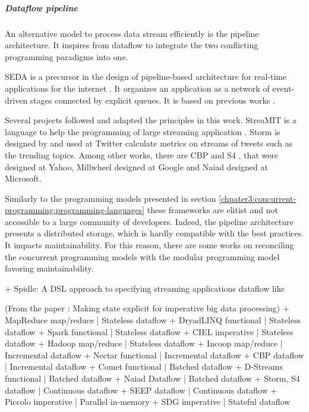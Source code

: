 \subparagraph{Dataflow pipeline} \label{chapter3:software-efficiency:dataflow-pipeline}

An alternative model to process data stream efficiently is the pipeline architecture.
It inspires from dataflow to integrate the two conflicting programming paradigms into one.

SEDA is a precursor in the design of pipeline-based architecture for real-time applications for the internet \cite{Welsh2001}.
It organizes an application as a network of event-driven stages connected by explicit queues.
It is based on previous works \cite{Gribble2001,Pai1999}.

Several projects followed and adapted the principles in this work.
StreaMIT is a language to help the programming of large streaming application \cite{Thies2002}.
Storm \cite{Toshniwal2014} is designed by and used at Twitter calculate metrics on streams of tweets such as the trending topics.
Among other works, there are CBP \cite{Logothetis2010} and S4 \cite{Neumeyer2010}, that were designed at Yahoo, Millwheel \cite{Akidau2013} designed at Google and Naiad \cite{Murray2013} designed at Microsoft.

Similarly to the programming models presented in section \ref{chpater3:concurrent-programming:programming-languages} these frameworks are elitist and not accessible to a large community of developers.
Indeed, the pipeline architecture presents a distributed storage, which is hardly compatible with the best practices.
It impacts maintainability.
For this reason, there are some works on reconciling the concurrent programming models with the modular programming model favoring maintainability.

+ Spidle: A DSL approach to specifying streaming applications dataflow like


  (From the paper : Making state explicit for imperative big data processing)
  + MapReduce       map/reduce   |   Stateless dataflow
  + DryadLINQ       functional   |   Stateless dataflow
  + Spark           functional   |   Stateless dataflow
  + CIEL            imperative   |   Stateless dataflow
  + Hadoop          map/reduce   |   Stateless dataflow
  + Incoop          map/reduce   |   Incremental dataflow
  + Nectar          functional   |   Incremental dataflow
  + CBP             dataflow     |   Incremental dataflow
  + Comet           functional   |   Batched dataflow
  + D-Streams       functional   |   Batched dataflow
  + Naiad           Dataflow     |   Batched dataflow
  + Storm, S4       dataflow     |   Continuous dataflow
  + SEEP            dataflow     |   Continuous dataflow
  + Piccolo         imperative   |   Parallel in-memory
  + SDG             imperative   |   Stateful dataflow

